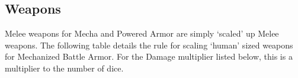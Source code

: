 \documentclass[twoside]{book}
\begin{document}
\begin{multicols}{2}
    \hspace{-2ex}
\vspace{1ex}


    \hspace{-2ex}
\vspace{1ex}


    
\end{multicols}
  
    

\subsection{Weapons}
    
    {  
      Melee weapons for Mecha and Powered Armor are
               simply `scaled' up Melee weapons. The
               following table details the rule for scaling
               `human' sized weapons for Mechanized Battle
               Armor. For the Damage multiplier listed below, this is a
               multiplier to the number of dice. 
    }
  
\end{document}
